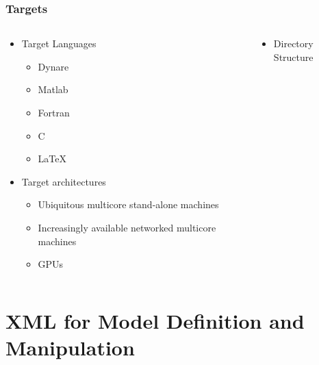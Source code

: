 \documentclass[handout]{beamer}
\begin{document}
\begin{frame}
  \frametitle{Targets}
  \begin{columns}
    \begin{column}{.5\linewidth}
      

  \begin{itemize}
\item Target Languages
    \begin{itemize}
    \item Dynare
    \item Matlab
    \item Fortran
    \item C
    \item \LaTeX
    \end{itemize}
\item Target architectures
  \begin{itemize}
\item Ubiquitous multicore stand-alone machines
  \item Increasingly available networked multicore machines
  \item GPUs
  \end{itemize}


  \end{itemize}
\end{column}
    \begin{column}{.5\linewidth}

      \begin{itemize}
      \item Directory Structure
      \end{itemize}





\end{column}

  \end{columns}


\end{frame}



\section{XML for  Model Definition and Manipulation}
\end{document}
